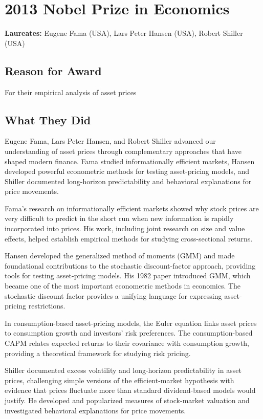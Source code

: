 \chapter{2013 Nobel Prize in Economics}
\textbf{Laureates: }Eugene Fama (USA), Lars Peter Hansen (USA), Robert Shiller (USA)

\section*{Reason for Award}
For their empirical analysis of asset prices

\section{What They Did}
Eugene Fama, Lars Peter Hansen, and Robert Shiller advanced our understanding of
asset prices through complementary approaches that have shaped modern finance.
Fama studied informationally efficient markets, Hansen developed powerful
econometric methods for testing asset-pricing models, and Shiller documented
long-horizon predictability and behavioral explanations for price movements.

Fama's research on informationally efficient markets showed why stock prices are
very difficult to predict in the short run when new information is rapidly
incorporated into prices. His work, including joint research on size and value
effects, helped establish empirical methods for studying cross-sectional returns.

Hansen developed the generalized method of moments (GMM) and made foundational
contributions to the stochastic discount-factor approach, providing tools for
testing asset-pricing models. His 1982 paper introduced GMM, which became one of
the most important econometric methods in economics. The stochastic discount
factor provides a unifying language for expressing asset-pricing restrictions.

In consumption-based asset-pricing models, the Euler equation links asset prices
to consumption growth and investors' risk preferences. The consumption-based CAPM
relates expected returns to their covariance with consumption growth, providing a
theoretical framework for studying risk pricing.

Shiller documented excess volatility and long-horizon predictability in asset
prices, challenging simple versions of the efficient-market hypothesis with
evidence that prices fluctuate more than standard dividend-based models would
justify. He developed and popularized measures of stock-market valuation and
investigated behavioral explanations for price movements.

